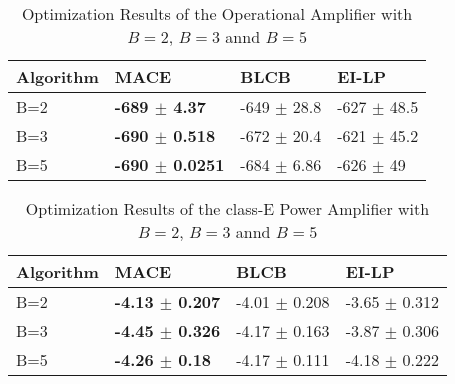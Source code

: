 \begin{table*}[!htb]
    \centering
    \caption{Optimization Results of the Operational Amplifier with $B = 2$, $B = 3$ annd $B = 5$}
    \label{tab:result_opamp_vary_B}
    \begin{tabular}{llll}
        \toprule
        Algorithm & MACE                        & BLCB                & EI-LP               \\ \midrule
        B=2       & \textbf{-689  $\pm$  4.37}    &  -649  $\pm$  28.8  &  -627  $\pm$  48.5  \\
        B=3       & \textbf{-690  $\pm$  0.518}   &  -672  $\pm$  20.4  &  -621  $\pm$  45.2  \\
        B=5       & \textbf{-690  $\pm$  0.0251}  &  -684  $\pm$  6.86  &  -626  $\pm$  49    \\




        \bottomrule
    \end{tabular}
\end{table*}


\begin{table*}[!htb]
    \centering
    \caption{Optimization Results of the class-E Power Amplifier with $B = 2$, $B = 3$ annd $B = 5$}
    \label{tab:result_classE_vary_B}
    \begin{tabular}{llll}
        \toprule
        Algorithm     & MACE                       & BLCB                        & EI-LP          \\
        \midrule
        B=2       & \textbf{-4.13  $\pm$  0.207}  &  -4.01  $\pm$  0.208  &  -3.65  $\pm$  0.312  \\
        B=3       & \textbf{-4.45  $\pm$  0.326}  &  -4.17  $\pm$  0.163  &  -3.87  $\pm$  0.306  \\
        B=5       & \textbf{-4.26  $\pm$  0.18 }  &  -4.17  $\pm$  0.111  &  -4.18  $\pm$  0.222  \\
        \bottomrule
    \end{tabular}
\end{table*}
